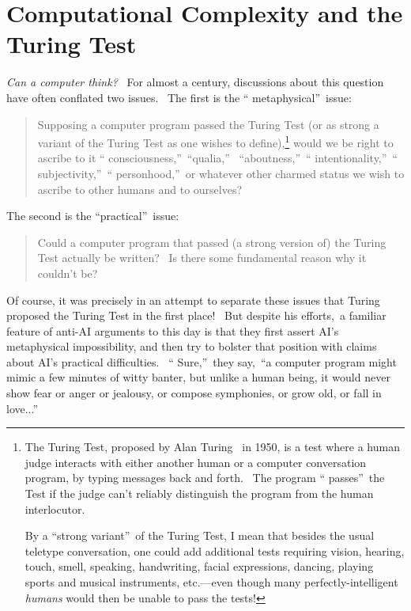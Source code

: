\documentclass[11pt,onecolumn]{article}%
\begin{document}
\section{Computational Complexity and the Turing Test\label{AI}}

\textit{Can a computer think?} \ For almost a century, discussions about this
question have often conflated two issues. \ The first is the \textquotedblleft
metaphysical\textquotedblright\ issue:

\begin{quotation}
\noindent Supposing a computer program passed the Turing Test (or as strong a
variant of the Turing Test as one wishes to define),\footnote{The Turing Test,
proposed by Alan Turing \cite{turing:ai}\ in 1950, is a test where a human
judge interacts with either another human or a computer conversation program,
by typing messages back and forth. \ The program \textquotedblleft
passes\textquotedblright\ the Test if the judge can't reliably distinguish the
program from the human interlocutor.
\par
By a \textquotedblleft strong variant\textquotedblright\ of the Turing Test, I
mean that besides the usual teletype conversation, one could add additional
tests requiring vision, hearing, touch, smell, speaking, handwriting, facial
expressions, dancing, playing sports and musical instruments, etc.---even
though many perfectly-intelligent \textit{humans} would then be unable to pass
the tests!} would we be right to ascribe to it \textquotedblleft
consciousness,\textquotedblright\ \textquotedblleft qualia,\textquotedblright%
\ \textquotedblleft aboutness,\textquotedblright\ \textquotedblleft
intentionality,\textquotedblright\ \textquotedblleft
subjectivity,\textquotedblright\ \textquotedblleft
personhood,\textquotedblright\ or whatever other charmed status we wish to
ascribe to other humans and to ourselves?
\end{quotation}

The second is the \textquotedblleft practical\textquotedblright\ issue:

\begin{quotation}
\noindent Could a computer program that passed (a strong version of) the
Turing Test actually be written? \ Is there some fundamental reason why it
couldn't be?
\end{quotation}

Of course, it was precisely in an attempt to separate these issues that Turing
proposed the Turing Test in the first place! \ But despite his efforts,\ a
familiar feature of anti-AI arguments to this day is that they first assert
AI's metaphysical impossibility, and then try to bolster that position with
claims about AI's practical difficulties. \ \textquotedblleft
Sure,\textquotedblright\ they say,\ \textquotedblleft a computer program might
mimic a few minutes of witty banter, but unlike a human being, it would never
show fear or anger or jealousy, or compose symphonies, or grow old, or fall in
love...\textquotedblright
\end{document}
